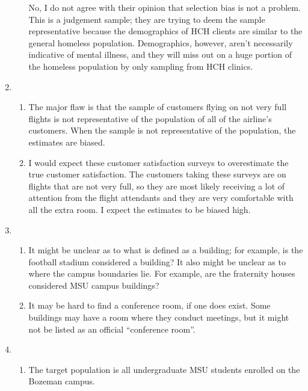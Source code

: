 \documentclass[11pt]{article}
\begin{document}
\begin{doublespace}
\begin{enumerate}
\begin{enumerate}
No, I do not agree with their opinion that selection bias is not a problem. This is a judgement sample; they are trying to deem the sample representative because the demographics of HCH clients are similar to the general homeless population. Demographics, however, aren't necessarily indicative of mental illness, and they will miss out on a huge portion of the homeless population by only sampling from HCH clinics.

\end{enumerate}

\item \begin{enumerate}
\item The major flaw is that the sample of customers flying on not very full flights is not representative of the population of all of the airline's customers. When the sample is not representative of the population, the estimates are biased. 

\item I would expect these customer satisfaction surveys to overestimate the true customer satisfaction. The customers taking these surveys are on flights that are not very full, so they are most likely receiving a lot of attention from the flight attendants and they are very comfortable with all the extra room. I expect the estimates to be biased high.
\end{enumerate} 

\item \begin{enumerate}

\item It might be unclear as to what is defined as a building; for example, is the football stadium considered a building? It also might be unclear as to where the campus boundaries lie. For example, are the fraternity houses considered MSU campus buildings?

\item It may be hard to find a conference room, if one does exist. Some buildings may have a room where they conduct meetings, but it might not be listed as an official ``conference room''.

\end{enumerate}

\item \begin{enumerate}

\item The target population is all undergraduate MSU students enrolled on the Bozeman campus.


\end{enumerate}
\end{enumerate}
\end{doublespace}
\end{document}
